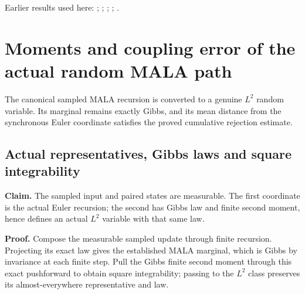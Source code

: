 \documentclass[11pt,a4paper]{report}
\begin{document}
Earlier results used here: \cite[Section~3.20.1]{LangevinLean2026ULASC}; \cite[Section~3.20.4]{LangevinLean2026ULASC}; \cite[Section~3.20.5]{LangevinLean2026ULASC}; \cite[Section~3.26.3]{LangevinLean2026ULASC}; \cite[Section~3.36.14]{LangevinLean2026ULASC}.
\section{\texorpdfstring{Moments and coupling error of the actual random MALA path}{Moments and coupling error of the actual random MALA path}}
\label{proof-module-WassersteinMixing-SemigroupRandomMALABounds-lean}


The canonical sampled MALA recursion is converted to a genuine \(L^2\) random variable. Its marginal remains exactly Gibbs, and its mean distance from the synchronous Euler coordinate satisfies the proved cumulative rejection estimate.

\subsection{\texorpdfstring{Actual representatives, Gibbs laws and square integrability}{Actual representatives, Gibbs laws and square integrability}}
\label{report-step-WassersteinMixing-SemigroupRandomMALABounds-lean-1}


\textbf{Claim.} The sampled input and paired states are measurable. The first coordinate is the actual Euler recursion; the second has Gibbs law and finite second moment, hence defines an actual \(L^2\) variable with that same law.



\textbf{Proof.} Compose the measurable sampled update through finite recursion. Projecting its exact law gives the established MALA marginal, which is Gibbs by invariance at each finite step. Pull the Gibbs finite second moment through this exact pushforward to obtain square integrability; passing to the \(L^2\) class preserves its almost-everywhere representative and law.
\end{document}
